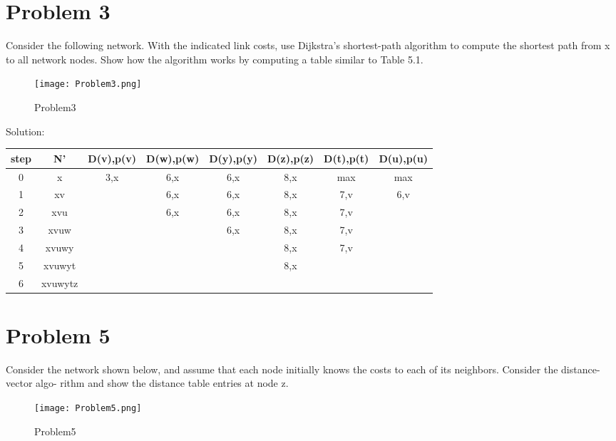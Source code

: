 \documentclass{article}
\begin{document}
\newpage
\section{Problem 3} Consider the following network. With the indicated link costs, use Dijkstra’s shortest-path algorithm to compute the shortest path from x to all network nodes. Show how the algorithm works by computing a table similar to Table 5.1.\\
\begin{figure}[htbp]
\begin{center}
\texttt{[image: Problem3.png]}
\caption{Problem3}
\label{default}
\end{center}
\end{figure}

\noindent Solution:
\begin{center}
  \begin{tabular}{@{} cccccccc @{}}
    \hline
    step & N' & D(v),p(v) & D(w),p(w) & D(y),p(y) & D(z),p(z) & D(t),p(t) & D(u),p(u) \\ 
    \hline
    0 & x & 3,x & 6,x & 6,x & 8,x & max & max \\ 
    1 & xv &  & 6,x & 6,x & 8,x & 7,v & 6,v \\ 
    2 & xvu &  & 6,x & 6,x & 8,x & 7,v &  \\ 
    3 & xvuw &  &  & 6,x & 8,x & 7,v &  \\ 
    4 & xvuwy &  &  &  & 8,x & 7,v &  \\ 
    5 & xvuwyt &  &  &  & 8,x &  &  \\ 
    6 & xvuwytz &  &  &  &  &  &  \\ 
    \hline
  \end{tabular}
\end{center}

\newpage
\section{Problem 5} Consider the network shown below, and assume that each node initially knows the costs to each of its neighbors. Consider the distance-vector algo- rithm and show the distance table entries at node z.\\
\begin{figure}[htbp]
\begin{center}
\texttt{[image: Problem5.png]}
\caption{Problem5}
\label{default}
\end{center}
\end{figure}
\end{document}
